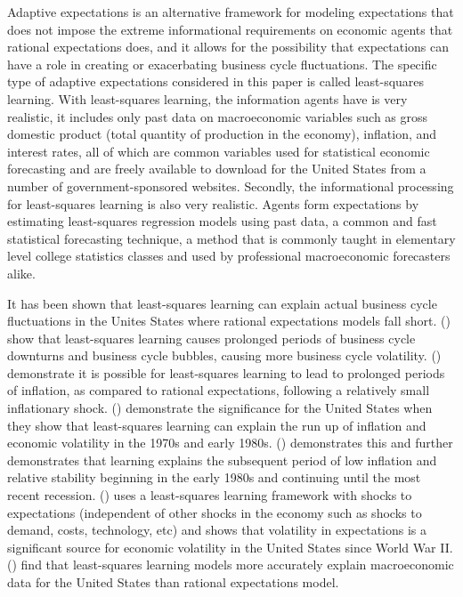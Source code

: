 \documentclass[11pt]{article}
\newcommand{\citee}[1]{\citename{#1} (\citeyear{#1})}
\begin{document}
Adaptive expectations is an alternative framework for modeling expectations that does not impose the extreme informational requirements on economic agents that rational expectations does, and it allows for the possibility that expectations can have a role in creating or exacerbating business cycle fluctuations.  The specific type of adaptive expectations considered in this paper is called least-squares learning.  With least-squares learning, the information agents have is very realistic, it includes only past data on macroeconomic variables such as gross domestic product (total quantity of production in the economy), inflation, and interest rates, all of which are common variables used for statistical economic forecasting and are freely available to download for the United States from a number of government-sponsored websites.  Secondly, the informational processing for least-squares learning is also very realistic.  Agents form expectations by estimating least-squares regression models using past data, a common and fast statistical forecasting technique, a method that is commonly taught in elementary level college statistics classes and used by professional macroeconomic forecasters alike.

It has been shown that least-squares learning can explain actual business cycle fluctuations in the Unites States where rational expectations models fall short.  \citee{eusepi_preston_2011} show that least-squares learning causes prolonged periods of business cycle downturns and business cycle bubbles, causing more business cycle volatility.  \citee{ow2005} demonstrate it is possible for least-squares learning to lead to prolonged periods of inflation, as compared to rational expectations, following a relatively small inflationary shock.  \citee{ow2005b} demonstrate the significance for the United States when they show that least-squares learning can explain the run up of inflation and economic volatility in the 1970s and early 1980s.  \citee{primiceri2006} demonstrates this and further demonstrates that learning explains the subsequent period of low inflation and relative stability beginning in the early 1980s and continuing until the most recent recession.  \citee{milani2011} uses a least-squares learning framework with shocks to expectations (independent of other shocks in the economy such as shocks to demand, costs, technology, etc) and shows that volatility in expectations is a significant source for economic volatility in the United States since World War II.  \citee{slobodyan_wouters_2009} find that least-squares learning models more accurately explain macroeconomic data for the United States than rational expectations model.
\end{document}
